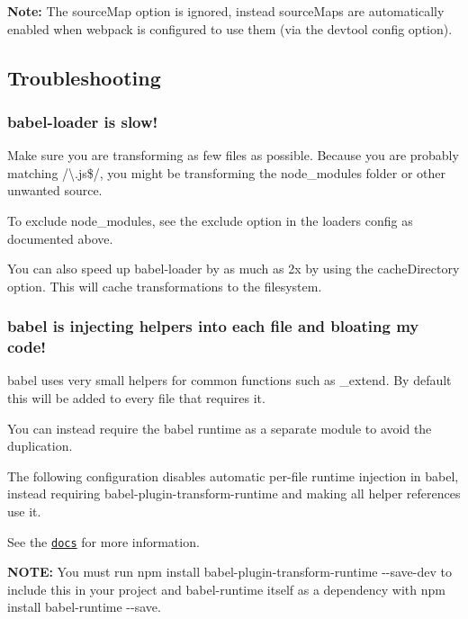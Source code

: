 {\bfseries Note\+:} The {\ttfamily source\+Map} option is ignored, instead source\+Maps are automatically enabled when webpack is configured to use them (via the {\ttfamily devtool} config option).

\subsection*{Troubleshooting}

\subsubsection*{babel-\/loader is slow!}

Make sure you are transforming as few files as possible. Because you are probably matching {\ttfamily /\textbackslash{}.js\$/}, you might be transforming the {\ttfamily node\+\_\+modules} folder or other unwanted source.

To exclude {\ttfamily node\+\_\+modules}, see the {\ttfamily exclude} option in the {\ttfamily loaders} config as documented above.

You can also speed up babel-\/loader by as much as 2x by using the {\ttfamily cache\+Directory} option. This will cache transformations to the filesystem.

\subsubsection*{babel is injecting helpers into each file and bloating my code!}

babel uses very small helpers for common functions such as {\ttfamily \+\_\+extend}. By default this will be added to every file that requires it.

You can instead require the babel runtime as a separate module to avoid the duplication.

The following configuration disables automatic per-\/file runtime injection in babel, instead requiring {\ttfamily babel-\/plugin-\/transform-\/runtime} and making all helper references use it.

See the \href{http://babeljs.io/docs/plugins/transform-runtime/}{\tt docs} for more information.

{\bfseries N\+O\+TE\+:} You must run {\ttfamily npm install babel-\/plugin-\/transform-\/runtime -\/-\/save-\/dev} to include this in your project and {\ttfamily babel-\/runtime} itself as a dependency with {\ttfamily npm install babel-\/runtime -\/-\/save}.


